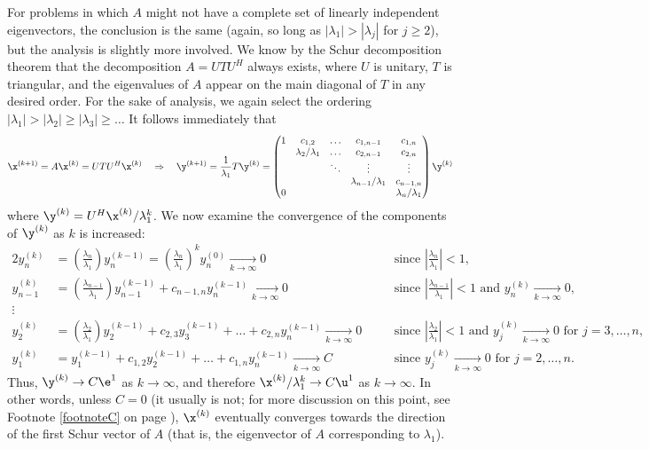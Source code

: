 For problems in which $A$ might not have a complete set of linearly independent eigenvectors, the conclusion is the same (again, so long as
$|\lambda_1|>|\lambda_j|$ for $j\ge 2$), but the analysis is slightly more involved.  We know by the Schur decomposition theorem that
the decomposition $A=UTU^H$ always exists, where $U$ is unitary, $T$ is triangular, and the eigenvalues of $A$ appear on the main diagonal
of $T$ in any desired order.
For the sake of analysis, we again select the ordering $|\lambda_1|>|\lambda_2|\ge|\lambda_3|\ge\ldots$  It follows immediately that
\begin{equation*}
\x^{(k+1)}=A\x^{(k)} = UTU^H \x^{(k)} \quad \Rightarrow \quad \y^{(k+1)}=\frac{1}{\lambda_1} T \y^{(k)} =
\begin{pmatrix} 1 & c_{1,2} & \ldots & c_{1,n-1} & c_{1,n} \\ 
                  & \lambda_2/\lambda_1 & \ldots & c_{2,n-1} & c_{2,n} \\
                  &  & \ddots & \vdots & \vdots \\ 
                  &  &  & \lambda_{n-1}/\lambda_1 & c_{n-1,n} \\ 
                0 &  &  &  & \lambda_n/\lambda_1 \\ \end{pmatrix} \y^{(k)}
\end{equation*} 
where $\y^{(k)}=U^H\x^{(k)}/\lambda^k_1$.  We now examine the convergence of the components of $\y^{(k)}$ as $k$ is increased:
\begin{alignat*}{2}
y_n^{(k)} &= \left(\frac{\lambda_n}{\lambda_1}\right) y_n^{(k-1)}=\left(\frac{\lambda_n}{\lambda_1}\right)^k y_n^{(0)} \xrightarrow[k\rightarrow \infty]{} 0 \quad
&&\textrm{since } \left|\frac{\lambda_n}{\lambda_1}\right|<1, \\
y_{n-1}^{(k)} &= \left(\frac{\lambda_{n-1}}{\lambda_1}\right) y_{n-1}^{(k-1)} + c_{n-1,n} y_{n}^{(k-1)} \xrightarrow[k\rightarrow \infty]{} 0 \quad
&&\textrm{since } \left|\frac{\lambda_{n-1}}{\lambda_1}\right|<1 \textrm{ and } y_n^{(k)} \xrightarrow[k\rightarrow \infty]{} 0,\\
\vdots \\
y_{2}^{(k)} &= \left(\frac{\lambda_{2}}{\lambda_1}\right) y_{2}^{(k-1)} + c_{2,3} y_{3}^{(k-1)}+\ldots+c_{2,n} y_{n}^{(k-1)} \xrightarrow[k\rightarrow \infty]{} 0 \quad
&&\textrm{since } \left|\frac{\lambda_{2}}{\lambda_1}\right|<1 \textrm{ and } y_j^{(k)} \xrightarrow[k\rightarrow \infty]{} 0 \textrm{ for } j=3,\ldots,n,\\
y_{1}^{(k)} &= y_{1}^{(k-1)} + c_{1,2} y_{2}^{(k-1)}+\ldots+c_{1,n} y_{n}^{(k-1)} \xrightarrow[k\rightarrow \infty]{} C \quad
&&\textrm{since } y_j^{(k)} \xrightarrow[k\rightarrow \infty]{} 0 \textrm{ for } j=2,\ldots,n.
\end{alignat*}
Thus, $\y^{(k)}\rightarrow C\e^1$ as $k\rightarrow\infty$, and therefore $\x^{(k)}/\lambda_1^k\rightarrow C\u^1$  as $k\rightarrow\infty$.
In other words, unless $C=0$ (it usually is not; for more discussion on this point, see Footnote \ref{footnoteC} on page \pageref{footnoteC}),
$\x^{(k)}$ eventually converges towards the direction of the first Schur vector of $A$ (that is, the eigenvector of $A$ corresponding to $\lambda_1$).
\vskip0.1in

